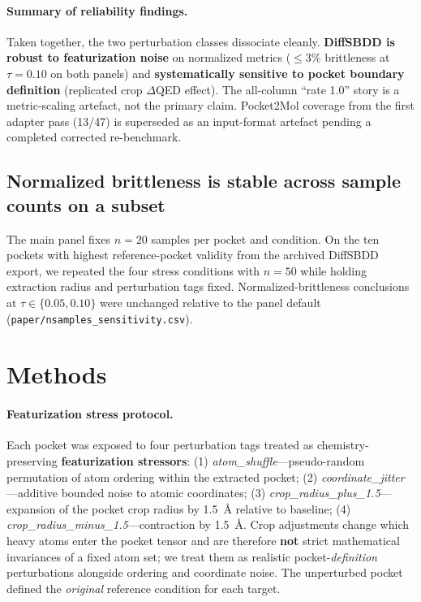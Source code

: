 \documentclass[11pt]{article}
\begin{document}
\paragraph{Summary of reliability findings.}
Taken together, the two perturbation classes dissociate cleanly. \textbf{DiffSBDD is robust to featurization noise} on normalized metrics ($\leq 3\%$ brittleness at $\tau=0.10$ on both panels) and \textbf{systematically sensitive to pocket boundary definition} (replicated crop $\Delta$QED effect). The all-column ``rate 1.0'' story is a metric-scaling artefact, not the primary claim. Pocket2Mol coverage from the first adapter pass (13/47) is superseded as an input-format artefact pending a completed corrected re-benchmark.

\subsection{Normalized brittleness is stable across sample counts on a subset}

The main panel fixes \textbf{$n = 20$} samples per pocket and condition. On the ten pockets with highest reference-pocket validity from the archived DiffSBDD export, we repeated the four stress conditions with \textbf{$n = 50$} while holding extraction radius and perturbation tags fixed. Normalized-brittleness conclusions at $\tau \in \{0.05, 0.10\}$ were unchanged relative to the panel default (\texttt{paper/nsamples\_sensitivity.csv}).

\section{Methods}

\paragraph{Featurization stress protocol.}
Each pocket was exposed to four perturbation tags treated as chemistry-preserving \textbf{featurization stressors}: (1) \emph{atom\_shuffle}---pseudo-random permutation of atom ordering within the extracted pocket; (2) \emph{coordinate\_jitter}---additive bounded noise to atomic coordinates; (3) \emph{crop\_radius\_plus\_1.5}---expansion of the pocket crop radius by 1.5~\r{A} relative to baseline; (4) \emph{crop\_radius\_minus\_1.5}---contraction by 1.5~\r{A}. Crop adjustments change which heavy atoms enter the pocket tensor and are therefore \textbf{not} strict mathematical invariances of a fixed atom set; we treat them as realistic pocket-\emph{definition} perturbations alongside ordering and coordinate noise. The unperturbed pocket defined the \emph{original} reference condition for each target.
\end{document}
